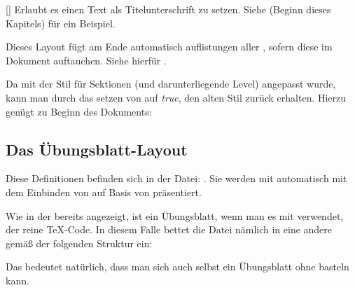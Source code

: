 %
%
%

[]
Erlaubt es einen Text als Titelunterschrift zu setzen. Siehe  (Beginn dieses Kapitels) für ein Beispiel.

\begin{bemerkung}
    Dieses Layout fügt am Ende automatisch auflistungen aller , sofern diese im Dokument auftauchen. Siehe hierfür .
\end{bemerkung}

Da mit  der Stil für Sektionen (und darunterliegende Level) angepasst wurde, kann man durch das setzen von  auf \emph{true}, den alten Stil zurück erhalten. Hierzu genügt zu Beginn des Dokuments:
\begin{latex}[morekeywords={[5]{\\lilly@mitschrieb@sectionlines@useold@true}}]
\makeatletter
    \lilly@mitschrieb@sectionlines@useold@true
\makeatother
\end{latex}

%
%
%
%
%

\subsection{Das Übungsblatt-Layout}
Diese Definitionen befinden sich in der Datei: . Sie werden mit  automatisch mit dem Einbinden von  auf Basis von  präsentiert.

\begin{bemerkung}
    Wie in der  bereits angezeigt, ist ein Übungsblatt, wenn man es mit \Jake verwendet, der reine \TeX-Code. In diesem Falle bettet \Jake die Datei nämlich in eine andere gemäß der folgenden Struktur ein:
Das bedeutet natürlich, dass man sich auch selbst ein Übungsblatt ohne \Jake basteln kann.
\end{bemerkung}

